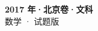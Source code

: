\documentclass[zihao=-4, a4paper]{ctexart}
\begin{document}
\begin{center}
  {\Large\bfseries 2017 年·北京卷·文科}\\[4pt]
  {\large 数学 · 试题版}
\end{center}
\medskip
{}

\end{document}
